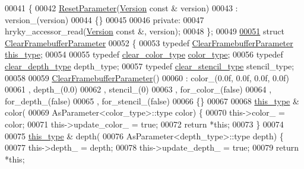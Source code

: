 \begin{DoxyCode}
00041     \{
00042         \hyperlink{structhryky_1_1opengl_1_1_module_1_1_reset_parameter}{ResetParameter}(\hyperlink{classhryky_1_1opengl_1_1_version}{Version} \textcolor{keyword}{const} & version)
00043             : version\_(version)
00044         \{\}
00045         
00046     \textcolor{keyword}{private}:
00047         hryky\_accessor\_read(\hyperlink{classhryky_1_1opengl_1_1_version}{Version} \textcolor{keyword}{const} &, version);
00048     \};
00049 
\hypertarget{opengl__module_8h_source_l00051}{}\hyperlink{structhryky_1_1opengl_1_1_module_1_1_clear_framebuffer_parameter}{00051}     \textcolor{keyword}{struct }\hyperlink{structhryky_1_1opengl_1_1_module_1_1_clear_framebuffer_parameter}{ClearFramebufferParameter}
00052     \{
00053         \textcolor{keyword}{typedef} \hyperlink{structhryky_1_1opengl_1_1_module_1_1_clear_framebuffer_parameter}{ClearFramebufferParameter} \hyperlink{structhryky_1_1opengl_1_1_module_1_1_clear_framebuffer_parameter}{this_type};
00054 
00055         \textcolor{keyword}{typedef} \hyperlink{classhryky_1_1color_1_1_rgba}{clear_color_type}    \hyperlink{classhryky_1_1color_1_1_rgba}{color_type};
00056         \textcolor{keyword}{typedef} \hyperlink{namespacehryky_1_1opengl_a5d4a0c96ecaa596a64f1efed8a51c089}{clear_depth_type}    depth\_type;
00057         \textcolor{keyword}{typedef} \hyperlink{namespacehryky_1_1opengl_a7340c1159eebfb6a57358d75a1b0629a}{clear_stencil_type}  stencil\_type;
00058         
00059         \hyperlink{structhryky_1_1opengl_1_1_module_1_1_clear_framebuffer_parameter}{ClearFramebufferParameter}()
00060             : color\_(0.0f, 0.0f, 0.0f, 0.0f)
00061               , depth\_(0.0)
00062               , stencil\_(0)
00063               , for\_color\_(\textcolor{keyword}{false})
00064               , for\_depth\_(\textcolor{keyword}{false})
00065               , for\_stencil\_(\textcolor{keyword}{false})
00066         \{\}
00067 
00068         \hyperlink{structhryky_1_1opengl_1_1_module_1_1_clear_framebuffer_parameter}{this_type} & color(
00069             AsParameter<color\_type>::type color) \{
00070             this->color\_ = color;
00071             this->update\_color\_ = \textcolor{keyword}{true};
00072             \textcolor{keywordflow}{return} *\textcolor{keyword}{this};
00073         \}
00074         
00075         \hyperlink{structhryky_1_1opengl_1_1_module_1_1_clear_framebuffer_parameter}{this_type} & depth(
00076             AsParameter<depth\_type>::type depth) \{
00077             this->depth\_ = depth;
00078             this->update\_depth\_ = \textcolor{keyword}{true};
00079             \textcolor{keywordflow}{return} *\textcolor{keyword}{this};

\end{DoxyCode}
